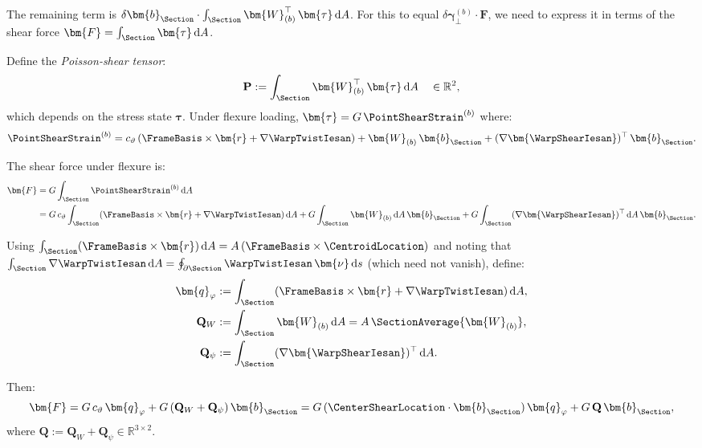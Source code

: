 The remaining term is $\delta\bm{b}_{\Section} \cdot \int_\Section \bm{W}_{(b)}^\top\,\bm{\tau} \, \mathrm{d}A$. 
For this to equal $\delta\bm{\gamma}_\perp^{(b)} \cdot \bm{F}$, we need to express 
it in terms of the shear force $\bm{F} = \int_\Section \bm{\tau} \, \mathrm{d}A$.

Define the \emph{Poisson-shear tensor}:
\begin{equation}
\mathbf{P} := \int_\Section \bm{W}_{(b)}^\top\,\bm{\tau} \, \mathrm{d}A 
\quad \in \mathbb{R}^2,
\label{eq:def-P}
\end{equation}
which depends on the stress state $\bm{\tau}$. Under flexure loading, 
$\bm{\tau} = G\,\PointShearStrain^{(b)}$ where:
\begin{equation*}
\PointShearStrain^{(b)} = c_\vartheta\,(\FrameBasis \times \bm{r} + \nabla\WarpTwistIesan) 
+ \bm{W}_{(b)}\,\bm{b}_{\Section} + (\nabla\bm{\WarpShearIesan})^\top\,\bm{b}_{\Section}.
\end{equation*}

The shear force under flexure is:
\begin{align}
\bm{F} &= G \int_\Section \PointShearStrain^{(b)} \, \mathrm{d}A \notag \\
&= G\,c_\vartheta \int_\Section (\FrameBasis \times \bm{r} + \nabla\WarpTwistIesan) \, \mathrm{d}A 
+ G \int_\Section \bm{W}_{(b)} \, \mathrm{d}A\,\bm{b}_{\Section} 
+ G \int_\Section (\nabla\bm{\WarpShearIesan})^\top \, \mathrm{d}A\,\bm{b}_{\Section}.
\label{eq:F-flexure}
\end{align}

Using $\int_\Section (\FrameBasis \times \bm{r}) \, \mathrm{d}A = A\,(\FrameBasis \times \CentroidLocation)$ 
and noting that $\int_\Section \nabla\WarpTwistIesan \, \mathrm{d}A = \oint_{\partial\Section} \WarpTwistIesan\,\bm{\nu} \, \mathrm{d}s$ 
(which need not vanish), define:
\begin{align}
\bm{q}_\varphi &:= \int_\Section (\FrameBasis \times \bm{r} + \nabla\WarpTwistIesan) \, \mathrm{d}A, 
\label{eq:def-q-phi} \\
\mathbf{Q}_W &:= \int_\Section \bm{W}_{(b)} \, \mathrm{d}A = A\,\SectionAverage{\bm{W}_{(b)}}, 
\label{eq:def-Q-W} \\
\mathbf{Q}_\psi &:= \int_\Section (\nabla\bm{\WarpShearIesan})^\top \, \mathrm{d}A.
\label{eq:def-Q-psi}
\end{align}

Then:
\begin{equation}
\bm{F} = G\,c_\vartheta\,\bm{q}_\varphi + G\,(\mathbf{Q}_W + \mathbf{Q}_\psi)\,\bm{b}_{\Section} 
= G\,(\CenterShearLocation \cdot \bm{b}_{\Section})\,\bm{q}_\varphi + G\,\mathbf{Q}\,\bm{b}_{\Section},
\label{eq:F-flexure-compact}
\end{equation}
where $\mathbf{Q} := \mathbf{Q}_W + \mathbf{Q}_\psi \in \mathbb{R}^{3 \times 2}$.

